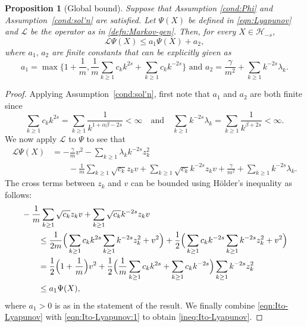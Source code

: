\documentclass[11pt]{amsart}
\theoremstyle{definition}
\renewcommand{\L}{\mathcal{L}}
\renewcommand{\H}{\mathcal{H}}
\theoremstyle{definition}
\theoremstyle{plain}
\newtheorem{proposition}[theorem]{Proposition}
\numberwithin{equation}{section}
\begin{document}
\begin{proposition}[Global bound] \label{prop:Ito-Lyapunov} Suppose that Assumption \ref{cond:Phi} and Assumption~\ref{cond:sol'n} are satisfied. Let $\Psi(X)$ be defined in \eqref{eqn:Lyapunov} and $\L$ be the operator as in \eqref{defn:Markov-gen}. Then, for every $X\in\H_{-s}$,
\begin{equation} \label{ineq:Ito-Lyapunov}
\L \Psi(X) \leq a_1\Psi(X)+a_2,
\end{equation}
where $a_1,\, a_2$ are finite constants that can be explicitly given as
\begin{displaymath}
a_1=\max\Big\{1+\frac{1}{m},\frac{1}{m}\sum_{k\geq 1}c_kk^{2s}+\sum_{k\geq 1}c_kk^{-2s}\Big\}\text{  and  }a_2=\frac{\gamma}{m^2}+\sum_{k\geq 1}k^{-2s}\lambda_k.
\end{displaymath}
\end{proposition}
\begin{proof} Applying Assumption~\ref{cond:sol'n}, first note that $a_1$ and $a_2$ are both finite since 
\begin{displaymath}
\sum_{k\geq 1}c_kk^{2s}=\sum_{k\geq 1}\frac{1}{ k^{1+\alpha\beta-2s}}<\infty\quad\text{and}\quad \sum_{k\geq 1}k^{-2s}\lambda_k=\sum_{k\geq 1}\frac{1}{k^{\beta+2s}}<\infty.  
\end{displaymath}
We now apply $\L$ to $\Psi$ to see that
\begin{equation}\label{eqn:Ito-Lyapunov}
\begin{aligned}
\L\Psi(X)
&=-\frac{\gamma}{m}v^2-\sum_{k\geq 1}\lambda_kk^{-2s}z_k^2\\
& \qquad -\frac{1}{m}\sum_{k\geq 1}\sqrt{c_k} z_kv+\sum_{k\geq 1}\sqrt{c_k}k^{-2s}z_kv+\frac{\gamma}{m^2}+\sum_{k\geq 1}k^{-2s}\lambda_k .  
\end{aligned}
\end{equation}
The cross terms between $z_k$ and $v$ can be bounded using H\"{o}lder's inequality as follows: 
\begin{equation}\label{eqn:Ito-Lyapunov:1}
\begin{aligned}   
\MoveEqLeft[2] -\frac{1}{m}\sum_{k\geq 1}\sqrt{c_k} z_k v +\sum_{k\geq 1}\sqrt{c_k}k^{-2s}z_k v  \\
&   \leq \frac{1}{2m}\Big(\sum_{k\geq 1}c_kk^{2s}\sum_{k\geq 1}k^{-2s}z_k ^2+v ^2\Big)+\frac{1}{2}\Big(\sum_{k\geq 1}c_kk^{-2s}\sum_{k\geq 1}k^{-2s}z_k ^2+v ^2\Big)\\
 &= \frac{1}{2}\Big(1+\frac{1}{m}\Big)v ^2+\frac{1}{2}\Big(\frac{1}{m}\sum_{k\geq 1}c_kk^{2s}+\sum_{k\geq 1}c_kk^{-2s}\Big)\sum_{k\geq 1}k^{-2s}z_k ^2\\
 &\leq a_1 \Psi(X),
\end{aligned}
\end{equation}
where $a_1>0$ is as in the statement of the result. We finally combine \eqref{eqn:Ito-Lyapunov} with \eqref{eqn:Ito-Lyapunov:1} to obtain \eqref{ineq:Ito-Lyapunov}.
\end{proof}
\end{document}
